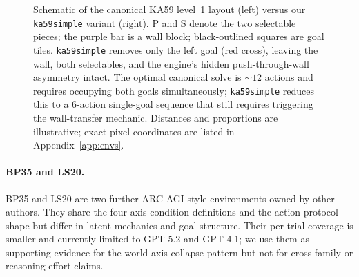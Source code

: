 \documentclass{article}
\begin{document}
\begin{figure}[t]
  \caption{Schematic of the canonical KA59 level~1 layout (left) versus our \texttt{ka59simple} variant (right). P and S denote the two selectable pieces; the purple bar is a wall block; black-outlined squares are goal tiles. \texttt{ka59simple} removes only the left goal (red cross), leaving the wall, both selectables, and the engine's hidden push-through-wall asymmetry intact. The optimal canonical solve is $\sim$$12$ actions and requires occupying both goals simultaneously; \texttt{ka59simple} reduces this to a $6$-action single-goal sequence that still requires triggering the wall-transfer mechanic. Distances and proportions are illustrative; exact pixel coordinates are listed in Appendix~\ref{app:envs}.}
  \label{fig:board}
\end{figure}

\paragraph{BP35 and LS20.}
BP35 and LS20 are two further ARC-AGI-style environments owned by other authors. They share the four-axis condition definitions and the action-protocol shape but differ in latent mechanics and goal structure. Their per-trial coverage is smaller and currently limited to GPT-5.2 and GPT-4.1; we use them as supporting evidence for the world-axis collapse pattern but not for cross-family or reasoning-effort claims.
\end{document}
